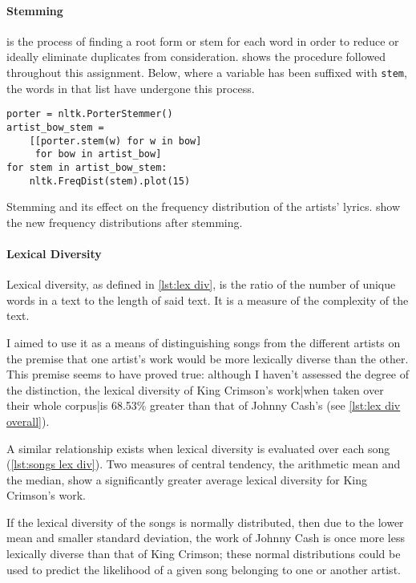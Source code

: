 \paragraph{Stemming} is the process of finding a root form or stem for each word in order to reduce or ideally eliminate duplicates from consideration.  shows the procedure followed throughout this assignment. Below, where a variable has been suffixed with \texttt{\textunderscore stem}, the words in that list have undergone this process.
\begin{listing}[h]
\begin{verbatim}
porter = nltk.PorterStemmer()
artist_bow_stem = 
	[[porter.stem(w) for w in bow]
	 for bow in artist_bow]
for stem in artist_bow_stem:
	nltk.FreqDist(stem).plot(15)
	\end{verbatim}
	\caption{Stemming and its effect on the frequency distribution of the artists' lyrics.  show the new frequency distributions after stemming.}
	\label{lst:stemming}
\end{listing}

\paragraph{Lexical Diversity}

Lexical diversity, as defined in \cref{lst:lex div}, is the ratio of the number of unique words in a text to the length of said text. It is a measure of the complexity of the text.

I aimed to use it as a means of distinguishing songs from the different artists on the premise that one artist's work would be more lexically diverse than the other. This premise seems to have proved true: although I haven't assessed the degree of the distinction, the lexical diversity of King Crimson's work|when taken over their whole corpus|is 68.53\% greater than that of Johnny Cash's (see \cref{lst:lex div overall}).

A similar relationship exists when lexical diversity is evaluated over each song (\cref{lst:songs lex div}). Two measures of central tendency, the arithmetic mean and the median, show a significantly greater average lexical diversity for King Crimson's work.

If the lexical diversity of the songs is normally distributed, then due to the lower mean and smaller standard deviation, the work of Johnny Cash is once more less lexically diverse than that of King Crimson; these normal distributions could be used to predict the likelihood of a given song belonging to one or another artist.

